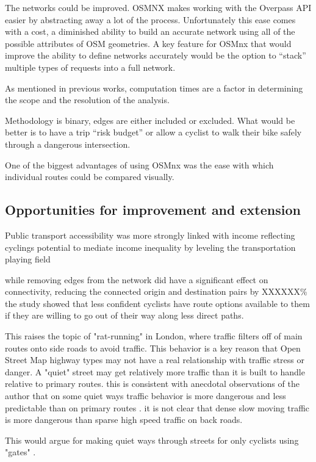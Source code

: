 The networks could be improved. OSMNX makes working with the Overpass API easier by abstracting away a lot of the process. Unfortunately this ease comes with a cost, a diminished ability to build an accurate network using all of the possible attributes of OSM geometries. A key feature for OSMnx that would improve the ability to define networks accurately would be the option to ``stack'' multiple types of requests into a full network.  

As mentioned in previous works, computation times are a factor in determining the scope and the resolution of the analysis. 

Methodology is binary, edges are either included or excluded. What would be better is to have a trip ``risk budget''  or allow a cyclist to walk their bike safely through a dangerous intersection. 

One of the biggest advantages of using OSMnx was the ease with which individual routes could be compared visually. 

\subsection{Opportunities for improvement and extension}

Public transport accessibility was more strongly linked with income reflecting cyclings potential to mediate income inequality by leveling the transportation playing field

while removing edges from the network did have a significant effect on connectivity, reducing the connected origin and destination pairs by XXXXXX\% the study showed that less confident cyclists have route options available to them if they are willing to go out of their way along less direct paths. 


This raises the topic of "rat-running" in London, where traffic filters off of main routes onto side roads to avoid traffic. This behavior is a key reason that Open Street Map highway types may not have a real relationship with traffic stress or danger. A "quiet" street may get relatively more traffic than it is built to handle relative to primary routes. this is consistent with anecdotal observations of the author that on some quiet ways traffic behavior is more dangerous and less predictable than on primary routes . it is not clear that dense slow moving traffic is more dangerous than sparse high speed traffic on back roads. 

This would argue for making quiet ways through streets for only cyclists using "gates" .